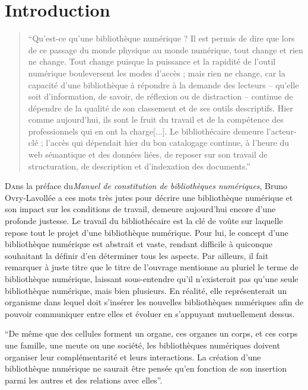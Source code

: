 \chapter{Introduction}

\begin{quote}
\enquote{Qu'est-ce qu'une bibliothèque numérique ? Il est permis de dire que lors de ce passage du monde physique au monde numérique, tout change et rien ne change. Tout change puisque la puissance et la rapidité de l'outil numérique bouleversent les modes d'accès ; mais rien ne change, car la capacité d'une bibliothèque à répondre à la demande des lecteurs -- qu'elle soit d'information, de savoir, de réflexion ou de distraction -- continue de dépendre de la qualité de son classement et de ses outils descriptifs. Hier comme aujourd'hui, ils sont le fruit du travail et de la compétence des professionnels qui en ont la charge[...]. Le bibliothécaire demeure l'acteur-clé ; l'accès qui dépendait hier du bon catalogage continue, à l'heure du web sémantique et des données liées, de reposer sur son travail de structuration, de description et d'indexation des documents.}
\end{quote}
\medskip

\lettrine{D}ans la préface du\textit {Manuel de constitution de bibliothèques numériques}, Bruno Ovry-Lavollée a ces mots très jutes pour décrire une bibliothèque numérique et son impact sur les conditions de travail, demeure aujourd'hui encore d'une profonde justesse. Le travail du bibliothécaire est la clé de voûte sur laquelle repose tout le projet d'une bibliothèque numérique. Pour lui, le concept d'une bibliothèque numérique est abstrait et vaste, rendant difficile à quiconque souhaitant la définir d'en déterminer tous les aspects. Par ailleurs, il fait remarquer à juste titre que le titre de l'ouvrage mentionne au pluriel le terme de bibliothèque numérique, laissant sous-entendre qu'il n'existerait pas qu'une seule bibliothèque numérique, mais bien plusieurs. En réalité, elle représenterait un organisme dans lequel doit s'insérer les nouvelles bibliothèques numériques afin de pouvoir communiquer entre elles et évoluer en s'appuyant mutuellement dessus.

\enquote{De même que des cellules forment un organe, ces organes un corps, et ces corps une famille, une meute ou une société, les bibliothèques numériques doivent organiser leur complémentarité et leurs interactions. La création d'une bibliothèque numérique ne saurait être pensée qu'en fonction de son insertion parmi les autres et des relations avec elles}.
\medskip

